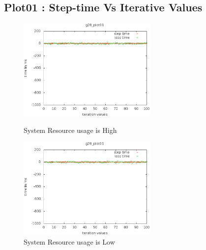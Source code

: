 \documentclass[a4paper,11pt]{article}
\begin{document}
\subsection{Plot01 : Step-time Vs Iterative Values}
 	\begin{figure}[ht]
	\begin{minipage}[ht]{0.5\linewidth}
	\includegraphics[height=50mm]{plots/g28_plot01.eps}
	\caption{System Resource usage is High }	
	\label{fig:ResourceIntensivePlot01}
	\end{minipage}	
	\begin{minipage}[ht]{0.5\linewidth}
	\includegraphics[height=50mm]{plots1/g28_plot01.eps}
	\caption{System Resource usage is Low}
	\label{fig:ResourceIntensivePlot01a}
	\end{minipage}	
	\end{figure}
\end{document}

